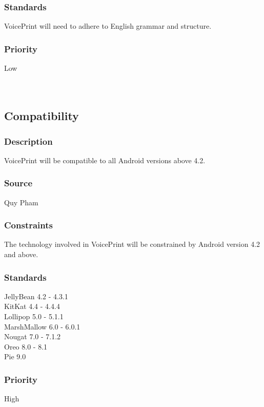 \subsubsection{Standards}
VoicePrint will need to adhere to English grammar and structure.
\subsubsection{Priority}
Low\\
\\
\\

\subsection{Compatibility}
\subsubsection{Description}
VoicePrint will be compatible to all Android versions above 4.2.
\subsubsection{Source}
Quy Pham
\subsubsection{Constraints}
The technology involved in VoicePrint will be constrained by Android version 4.2 and above. 
\subsubsection{Standards}
JellyBean 4.2 - 4.3.1 \cite{Android} \\
KitKat 4.4 - 4.4.4 \cite{Android} \\
Lollipop 5.0 - 5.1.1 \cite{Android} \\
MarshMallow 6.0 - 6.0.1 \cite{Android} \\
Nougat 7.0 - 7.1.2 \cite{Android} \\
Oreo 8.0 - 8.1 \cite{Android} \\
Pie 9.0 \cite{Android} \\ 
\subsubsection{Priority}
High\\
\\
\\

